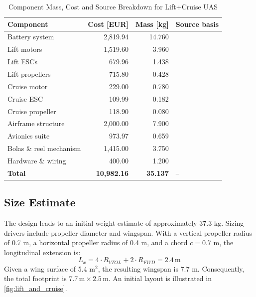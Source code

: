 \begin{table}[H]
    \centering
    \caption{Component Mass, Cost and Source Breakdown for Lift+Cruise UAS}
    \label{tab:component_breakdown}
    \small
    \setlength{\tabcolsep}{4pt}
    \renewcommand{\arraystretch}{1.15}
    \begin{tabularx}{\textwidth}{@{}XrrX@{}}
        \toprule
        \textbf{Component} & \textbf{Cost [EUR]} & \textbf{Mass [kg]} & \textbf{Source basis} \\
        \midrule
        Battery system & 2,819.94 & 14.760 & \cite{TattuGmbH} \\
        Lift motors & 1,519.60 & 3.960 & \cite{U13Drones} \\
        Lift ESCs & 679.96 & 1.438 & \cite{ALPHAStability} \\
        Lift propellers & 715.80 & 0.428 & \cite{G3211Store} \\
        Cruise motor & 229.00 & 0.780 & \cite{AT7224Smooth} \\
        Cruise ESC & 109.99 & 0.182 & \cite{T-MOTORController} \\
        Cruise propeller & 118.90 & 0.080 & \cite{AUZPropeller} \\
        Airframe structure & 2,000.00 & 7.900 & \cite{CarbonCompositesb,CarbonComposites,Aluminum7075-T651,CuredComposites} \\
        Avionics suite & 973.97 & 0.659 & \cite{PixhawkStore,DroneCANStore,SiKStore,PM08-CANStore,AS150Amass,FLYRCGames,AlleDrones} \\
        Bolas \& reel mechanism & 1,415.00 & 3.750 & \cite{GummiuberzogeneOse,D12Ltd,MarlowPB,UmarexPatronen,UmarexAccessoires,ASAZ-RAM.net,16mmComposites,RSRS,HS-5085MGRCD,CuredComposites} \\
        Hardware \& wiring & 400.00 & 1.200 & \cite{AS150Amass,FLYRCGames,AlleDrones,CuredComposites} \\
        \midrule
        \textbf{Total} & \textbf{10,982.16} & \textbf{35.137} & -- \\
        \bottomrule
    \end{tabularx}
\end{table}
\subsection*{Size Estimate}
The design leads to an initial weight estimate of approximately 37.3 kg. Sizing drivers include propeller diameter and wingspan. With a vertical propeller radius of 0.7 m, a horizontal propeller radius of 0.4 m, and a chord $c = 0.7$ m, the longitudinal extension is:
\begin{equation}
    L_x = 4 \cdot R_{VTOL} + 2 \cdot R_{FWD} = 2.4\,\text{m}
\end{equation}
Given a wing surface of 5.4 m$^2$, the resulting wingspan is 7.7 m. Consequently, the total footprint is $7.7\,\text{m} \times 2.5\,\text{m}$. An initial layout is illustrated in \autoref{fig:lift_and_cruise}.

